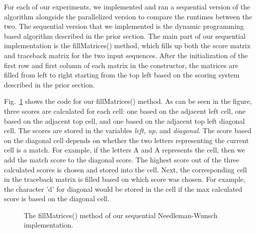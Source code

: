 \documentclass[conference]{IEEEtran}
\begin{document}
For each of our experiments, we implemented and ran a sequential version of the algorithm alongside the parallelized version to compare the runtimes between the two. The sequential version that we implemented is the dynamic programming based algorithm described in the prior section. The main part of our sequential implementation is the fillMatrices() method, which fills up both the score matrix and traceback matrix for the two input sequences. After the initialization of the first row and first column of each matrix in the constructor, the matrices are filled from left to right starting from the top left based on the scoring system described in the prior section.

Fig.~\ref{9} shows the code for our fillMatrices() method. As can be seen in the figure, three scores are calculated for each cell: one based on the adjacent left cell, one based on the adjacent top cell, and one based on the adjacent top left diagonal cell. The scores are stored in the variables \emph{left}, \emph{up}, and \emph{diagonal}. The score based on the diagonal cell depends on whether the two letters representing the current cell is a match. For example, if the letters A and A represents the cell, then we add the match score to the diagonal score. The highest score out of the three calculated scores is chosen and stored into the cell. Next, the corresponding cell in the traceback matrix is filled based on which score was chosen. For example, the character 'd' for diagonal would be stored in the cell if the max calculated score is based on the diagonal cell.

\begin{figure}[htbp]
\centerline{}
\caption{The fillMatrices() method of our sequential Needleman-Wunsch implementation.}
\label{9}
\end{figure}
\end{document}

